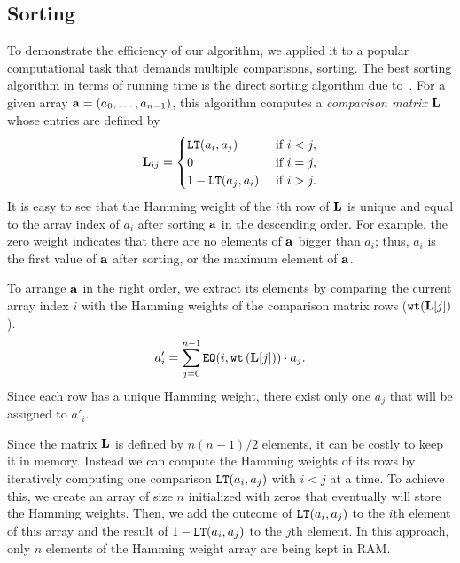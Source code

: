 \subsection{Sorting}
\label{subsec:sorting}

	To demonstrate the efficiency of our algorithm, we applied it to a popular computational task that demands multiple comparisons, sorting.
	The best sorting algorithm in terms of running time is the direct sorting algorithm due to~\cite{CDSS15}.
	For a given array $\mathbf{a} = (a_0,\dots,a_{n-1})$, this algorithm computes a \emph{comparison matrix} $\mathbf{L}$ whose entries are defined by
	\begin{align*}
		\mathbf{L}_{ij} =
		\begin{cases}
			\mathtt{LT}(a_i, a_j) & \text{ if } i < j, \\
			0 & \text{ if } i = j, \\
			1 - \mathtt{LT}(a_j, a_i) & \text{ if } i > j.
		\end{cases}
	\end{align*}
	It is easy to see that the Hamming weight of the $i$th row of $\mathbf{L}$ is unique and equal to the array index of $a_i$ after sorting $\mathbf{a}$ in the descending order.
	For example, the zero weight indicates that there are no elements of $\mathbf{a}$ bigger than $a_i$; thus, $a_i$ is the first value of $\mathbf{a}$ after sorting, or the maximum element of $\mathbf{a}$.

	To arrange $\mathbf{a}$ in the right order, we extract its elements by comparing the current array index $i$ with the Hamming weights of the comparison matrix rows ($\texttt{wt}(\mathbf{L}[j])$).  
	\begin{align*}
		a'_i = \sum_{j=0}^{n-1} \mathtt{EQ}(i,\texttt{wt}\left(\mathbf{L}[j]\right)) \cdot a_j.
	\end{align*}
	Since each row has a unique Hamming weight, there exist only one $a_j$ that will be assigned to $a'_i$.

	\begin{remark}
		Since the matrix $\mathbf{L}$ is defined by $n(n-1)/2$ elements, it can be costly to keep it in memory.
		Instead we can compute the Hamming weights of its rows by iteratively computing one comparison $\mathtt{LT}(a_i, a_j)$ with $i < j$ at a time.
		To achieve this, we create an array of size $n$ initialized with zeros that eventually will store the Hamming weights.
		Then, we add the outcome of $\mathtt{LT}(a_i, a_j)$ to the $i$th element of this array and the result of $1-\mathtt{LT}(a_i, a_j)$ to the $j$th element.
		In this approach, only $n$ elements of the Hamming weight array are being kept in RAM.
	\end{remark}

